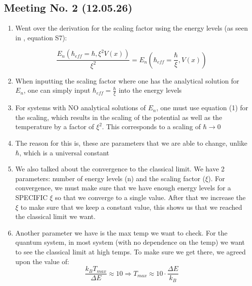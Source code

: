 \documentclass{article}
\numberwithin{equation}{subsection}
\begin{document}
\subsection*{Meeting No. 2 (12.05.26)}
\begin{enumerate}[label=\textbf{\Alph*.}]
    
\item Went over the derivation for the scaling factor using the energy levels (as seen in \cite{GelbwaserKlimovsky2018}, equation S7): 

\begin{equation}
\frac{E_n (\hbar_{eff}=\hbar, \xi^2 V(x))}{\xi^2} =E_n(\hbar_{eff}=\frac{\hbar}{\xi}, V(x))   
\end{equation}

\item When inputting the scaling factor where one has the analytical solution for $E_n$, one can simply input $\hbar_{eff}=\frac{\hbar}{\xi}$ into the energy levels

\item For systems with NO analytical solutions of $E_n$, one must use equation (1) for the scaling, which results in the scaling of the potential as well as the temperature by a factor of $\xi^2$. This corresponds to a scaling of $\hbar \to 0$

\item The reason for this is, these are parameters that we are able to change, unlike $\hbar$, which is a universal constant

\item We also talked about the convergence to the classical limit. We have 2 parameters: number of energy levels (n) and the scaling factor ($\xi$). For convergence, we must make sure that we have enough energy levels for a SPECIFIC $\xi$ so that we converge to a single value. After that we increase the $\xi$ to make sure that we keep a constant value, this shows us that we reached the classical limit we want.

\item Another parameter we have is the max temp we want to check. For the quantum system, in most system (with no dependence on the temp) we want to see the classical limit at high temps. To make sure we get there, we agreed upon the value of:
\begin{equation}
    \frac{k_BT_{max}}{\Delta E}\approx10 \Rightarrow T_{max} \approx 10\cdot\frac{\Delta E}{k_B}
\end{equation}
\end{enumerate}
\end{document}
